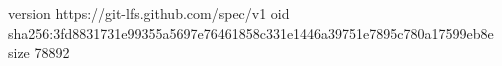 version https://git-lfs.github.com/spec/v1
oid sha256:3fd8831731e99355a5697e76461858c331e1446a39751e7895c780a17599eb8e
size 78892
